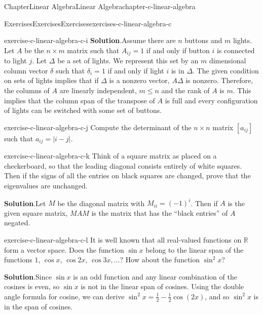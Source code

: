 \documentclass[oneside,10pt,]{book}
\newcommand{\blocktitlefont}{\relax}
\numberwithin{equation}{section}
\begin{document}
\begin{chapterptx}{Chapter}{Linear Algebra}{}{Linear Algebra}{}{}{chapter-c-linear-algebra}
\begin{exercises-section}{Exercises}{Exercises}{}{Exercises}{}{}{exercises-c-linear-algebra-c}
\begin{divisionexercise}{8}{}{}{exercise-c-linear-algebra-c-i}
\noindent\textbf{\blocktitlefont Solution}.\hypertarget{solution-c-linear-algebra-c-i-c}{}\quad{}Assume there are \(n\) buttons and \(m\) lights.  Let \(A\) be the \(n \times m\) matrix such that \(A_{i j} = 1\) if and only if button \(i\) is connected to light \(j\).  Let \(\Delta\) be a set of lights.  We represent this set by an \(m\) dimensional column vector \(\delta\) such that \(\delta_{i} = 1\) if and only if light \(i\) is in \(\Delta\).  The given condition on sets of lights implies that if \(\Delta\) is a nonzero vector, \(A \Delta\) is nonzero. Therefore, the columns of \(A\) are linearly independent, \(m \leq n\) and the rank of \(A\) is \(m\).  This implies that the column span of the transpose of \(A\) is full and every configuration of lights can be switched with some set of buttons.%
\end{divisionexercise}%
\begin{divisionexercise}{9}{}{}{exercise-c-linear-algebra-c-j}%
Compute the determinant of the \(n \times  n\) matrix \(\left[a_{i j}\right]\) such that \(a_{i j} =\lvert i-j\rvert\).%
\end{divisionexercise}%
\begin{divisionexercise}{10}{}{}{exercise-c-linear-algebra-c-k}%
Think of a square matrix as placed on a checkerboard, so that the leading diagonal consists entirely of white squares. Then if the signs of all the entries on black squares are changed, prove that the eigenvalues are unchanged.%
\par\smallskip%
\noindent\textbf{\blocktitlefont Solution}.\hypertarget{solution-c-linear-algebra-c-k-b}{}\quad{}Let \(M\) be the diagonal matrix with \(M_{i i}=(-1)^i\).  Then if \(A\) is the given square matrix, \(M A M\) is the matrix that has the ``black entries'' of \(A\) negated.%
\end{divisionexercise}%
\begin{divisionexercise}{11}{}{}{exercise-c-linear-algebra-c-l}%
It is well known that all real-valued functions on \(\mathbb{R}\) form a vector space. Does the function \(\sin  x\) belong to the linear span of the functions \(1\), \(\cos x\), \(\cos 2 x\), \(\cos 3 x,\ldots\)?    How about the function \(\sin^2 x\)?%
\par\smallskip%
\noindent\textbf{\blocktitlefont Solution}.\hypertarget{solution-c-linear-algebra-c-l-b}{}\quad{}Since \(\sin  x\) is an odd function and any linear combination of the cosines is even, so \(\sin  x\) is not in the linear span of cosines.  Using the double angle formula for cosine, we can derive \(\sin^2 x = \frac{1}{2}-\frac{1}{2} \cos (2 x)\), and so \(\sin^2 x\) is in the span of cosines.%

\end{divisionexercise}
\end{exercises-section}
\end{chapterptx}
\end{document}
